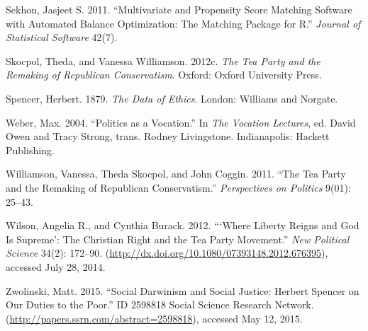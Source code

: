 \documentclass[12pt,]{article}
\begin{document}
Sekhon, Jasjeet S. 2011. ``Multivariate and Propensity Score Matching
Software with Automated Balance Optimization: The Matching Package for
R.'' \emph{Journal of Statistical Software} 42(7).

Skocpol, Theda, and Vanessa Williamson. 2012c. \emph{The Tea Party and
the Remaking of Republican Conservatism}. Oxford: Oxford University
Press.

Spencer, Herbert. 1879. \emph{The Data of Ethics}. London: Williams and
Norgate.

Weber, Max. 2004. ``Politics as a Vocation.'' In \emph{The Vocation
Lectures}, ed. David Owen and Tracy Strong, trans. Rodney Livingstone.
Indianapolis: Hackett Publishing.

Williamson, Vanessa, Theda Skocpol, and John Coggin. 2011. ``The Tea
Party and the Remaking of Republican Conservatism.'' \emph{Perspectives
on Politics} 9(01): 25--43.

Wilson, Angelia R., and Cynthia Burack. 2012. ```Where Liberty Reigns
and God Is Supreme': The Christian Right and the Tea Party Movement.''
\emph{New Political Science} 34(2): 172--90.
(\url{http://dx.doi.org/10.1080/07393148.2012.676395}), accessed July
28, 2014.

Zwolinski, Matt. 2015. ``Social Darwinism and Social Justice: Herbert
Spencer on Our Duties to the Poor.'' ID 2598818 Social Science Research
Network. (\url{http://papers.ssrn.com/abstract=2598818}), accessed May
12, 2015.
\end{document}
